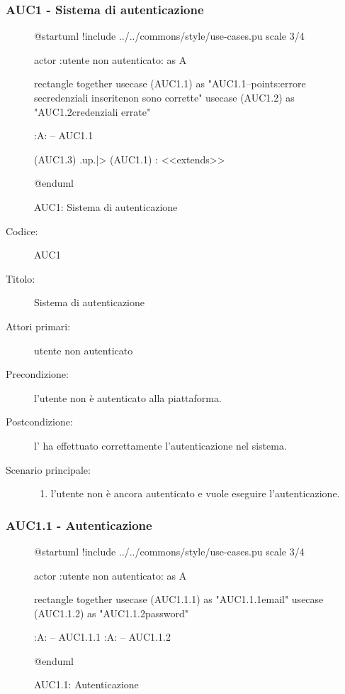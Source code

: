\documentclass[../analisi-dei-requisiti.tex]{subfiles}
\begin{document}
\subsubsection{AUC1 - Sistema di autenticazione}%
\label{subsub:AUC1}

\begin{figure}[h!]
  \centering
  \begin{plantuml}
  @startuml
  !include ../../commons/style/use-cases.pu
  scale 3/4

  actor :utente non autenticato: as A

  rectangle {
    together {
      usecase (AUC1.1) as "AUC1.1\nAutenticazione\n--\nExtension points:\nVisualizzazione errore se\nle credenziali inserite\n non sono corrette"
      usecase (AUC1.2) as "AUC1.2\nVisualizzazione credenziali errate"
    }
  }

  :A: -- AUC1.1

  (AUC1.3) .up.|> (AUC1.1) : <<extends>>

  @enduml
  \end{plantuml}
  \caption{AUC1: Sistema di autenticazione}
  \label{fig:auc1}
\end{figure}

\begin{description}
  \item[Codice:] AUC1
  \item[Titolo:] Sistema di autenticazione
  \item[Attori primari:] utente non autenticato
  \item[Precondizione:] l'utente non è autenticato alla piattaforma.
  \item[Postcondizione:] l' ha effettuato correttamente l'autenticazione nel sistema.
  \item[Scenario principale:]
  \begin{enumerate}
    \item l'utente non è ancora autenticato e vuole eseguire l'autenticazione.
  \end{enumerate}
\end{description}

\subsubsection{AUC1.1 - Autenticazione}%
\label{subsub:AUC1.1}

\begin{figure}[h!]
  \centering
  \begin{plantuml}
  @startuml
  !include ../../commons/style/use-cases.pu
  scale 3/4

  actor :utente non autenticato: as A

  rectangle {
    together {
    usecase (AUC1.1.1) as "AUC1.1.1\nInserimento email"
    usecase (AUC1.1.2) as "AUC1.1.2\nInserimento password"
    }
  }

  :A: -- AUC1.1.1
  :A: -- AUC1.1.2

  @enduml
  \end{plantuml}
  \caption{AUC1.1: Autenticazione}
  \label{fig:auc1_1}
\end{figure}
\end{document}
